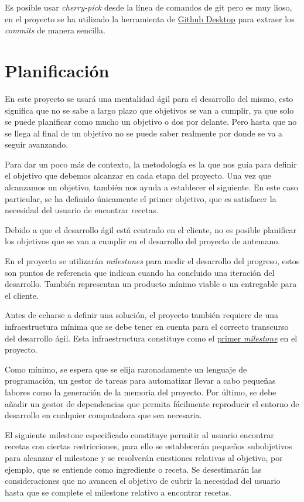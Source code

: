 \begin{enumerate}
Es posible usar \emph{cherry-pick} desde la línea de comandos de git pero es muy lioso, en el proyecto se ha utilizado la herramienta de \href{https://desktop.github.com/}{Github Desktop} para extraer los \emph{commits} de manera sencilla.

\section{Planificación}
En este proyecto se usará una mentalidad ágil para el desarrollo del mismo, esto significa que no se sabe a largo plazo que objetivos se van a cumplir, ya que solo se puede planificar como mucho un objetivo o dos por delante. Pero hasta que no se llega al final de un objetivo no se puede saber realmente por donde se va a seguir avanzando.

Para dar un poco más de contexto, la metodología es la que nos guía para definir el objetivo que debemos alcanzar en cada etapa del proyecto. Una vez que alcanzamos un objetivo, también nos ayuda a establecer el siguiente. En este caso particular, se ha definido únicamente el primer objetivo, que es satisfacer la necesidad del usuario de encontrar recetas. 

Debido a que el desarrollo ágil está centrado en el cliente, no es posible planificar los objetivos que se van a cumplir en el desarrollo del proyecto de antemano.  

En el proyecto se utilizarán \emph{milestones} para medir el desarrollo del progreso, estos son puntos de referencia que indican cuando ha concluido una iteración del desarrollo. También representan un producto mínimo viable o un entregable para el cliente.\cite{milestone2022}

Antes de echarse a definir una solución, el proyecto también requiere de una infraestructura mínima que se debe tener en cuenta para el correcto transcurso del desarrollo ágil. Esta infraestructura constituye como el \href{https://github.com/Slowmybrosh/TFG-DietPlanner/milestone/10}{primer \emph{milestone}} en el proyecto.

Como mínimo, se espera que se elija razonadamente un lenguaje de programación, un gestor de tareas para automatizar llevar a cabo pequeñas labores como la generación de la memoria del proyecto. Por último, se debe añadir un gestor de dependencias que permita fácilmente reproducir el entorno de desarrollo en cualquier computadora que sea necesaria.

El siguiente milestone especificado constituye permitir al usuario encontrar recetas con ciertas restricciones, para ello se establecerán pequeños subobjetivos para alcanzar el milestone y se resolverán cuestiones relativas al objetivo, por ejemplo, que se entiende como ingrediente o receta. Se desestimarán las consideraciones que no avancen el objetivo de cubrir la necesidad del usuario hasta que se complete el milestone relativo a encontrar recetas.


\end{enumerate}
